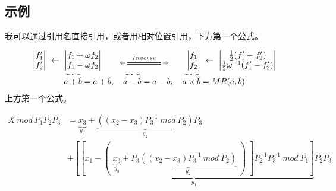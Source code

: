 \documentclass[a4paper]{article}
\begin{document}
	\subsection{示例}
	\begin{body}
		我可以通过引用名直接引用{\gqq}，或者用相对位置引用，下方第一个公式{\gqq}\nfeqid{\cqq}。\par
		\begin{equation}
		\begin{gathered}
		\begin{vmatrix}
		f'_{1}\\
		f'_{2}\\
		\end{vmatrix}\ \leftarrow\
		\begin{vmatrix}
		f_{1}+\omega f_{2}\\
		f_{1}-\omega f_{2}\\
		\end{vmatrix}
		\qquad\xLongleftrightarrow{8.0}{Inverse}\qquad
		\begin{vmatrix}
		f_{1}\\
		f_{2}\\
		\end{vmatrix}\ \leftarrow\
		\begin{vmatrix}
		\frac{1}{2}(f'_{1}+f'_{2})\\
		\frac{1}{2}\omega^{-1}(f'_{1}-f'_{2})\\
		\end{vmatrix}\\
		\widetilde{\tilde{a}+\tilde{b}}=\tilde{a}+\tilde{b},\quad\widetilde{\tilde{a}-\tilde{b}}=\tilde{a}-\tilde{b},\quad\widetilde{\tilde{a}\times\tilde{b}}=MR(\tilde{a},\tilde{b})\\
		\end{gathered}
		\end{equation}
		上方第一个公式{\gqq}\nbeqid{\cqq}。\par
		\begin{equation}
		\begin{aligned}
		X\ mod\ P_{1}P_{2}P_{3}&=\underbrace{x_3}_{y_3}+\underbrace{((x_2-x_3)P_3^{-1}\ mod\ P_2)}_{y_2}P_3\\
		&+\underbrace{[[x_1-(\;\underbrace{x_3}_{y_3}+P_3\underbrace{((x_2-x_3)P_3^{-1}\ mod\ P_2)}_{y_2}\;)\;]P_2^{-1}P_3^{-1}\ mod\ P_1]}_{y_1}P_2P_3
		\end{aligned}
		\end{equation}
		\begin{equation}[Cooley-Turkey]
			\begin{aligned}

\end{aligned}
\end{equation}
\end{body}
\end{document}

